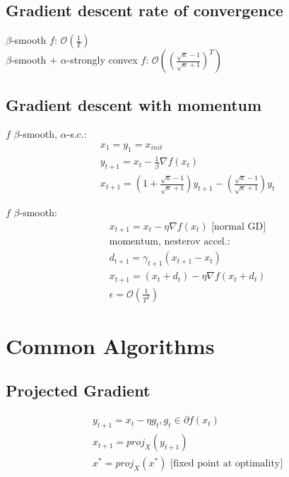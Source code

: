 \documentclass[8pt,letter]{article}
\begin{document}
\begin{multicols*}{2}
  \subsection {Gradient descent rate of convergence}
  $\beta$-smooth $f$: $\mathcal{O}(\frac{1}{T})$\\
  $\beta$-smooth + $\alpha$-strongly convex $f$: $\mathcal{O}((\frac{\sqrt{\kappa}-1}{\sqrt{\kappa}+1})^T)$

  \subsection {Gradient descent with momentum}
  $f$ $\beta$-smooth, $\alpha$-s.c.:
  \begin{align*}
    & x_1=y_1 = x_{init}\\
    & y_{t+1} = x_t - \frac{1}{\beta} \nabla f(x_t)\\
    & x_{t+1} = \left(1+\frac{\sqrt{\kappa}-1}{\sqrt{\kappa}+1}\right) y_{t+1} - \left(\frac{\sqrt{\kappa}-1}{\sqrt{\kappa}+1}\right) y_t
  \end{align*}

  $f$ $\beta$-smooth:
  \begin{align*}
    & x_{t+1}=x_t-\eta \nabla f(x_t) \text{ [normal GD]}\\
    & \text{momentum, nesterov accel.:}\\
    & d_{t+1} = \gamma_{t+1}(x_{t+1} - x_t)\\
    & x_{t+1} = (x_t + d_t) - \eta \nabla f(x_t + d_t)\\
    & \epsilon=\mathcal{O}\left(\frac{1}{T^2}\right)
  \end{align*}

  \section {Common Algorithms}

  \subsection {Projected Gradient}
  \begin{align*}
    & y_{t+1} = x_t - \eta g_t, g_t \in \partial f(x_t)\\
    & x_{t+1} = proj_{X}(y_{t+1})\\
    & x^*=proj_{X}(x^*) \text{ [fixed point at optimality]}
  \end{align*}


\end{multicols*}
\end{document}
